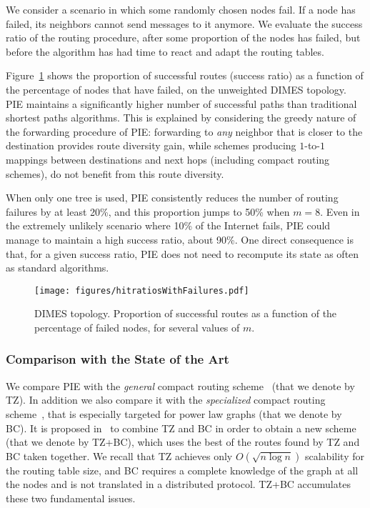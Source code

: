 \documentclass[conference]{IEEEtran}
\begin{document}
We consider a scenario in which some randomly chosen nodes fail. If a node has failed, its neighbors cannot send messages to it anymore. We evaluate the success ratio of the routing procedure, after some proportion of the nodes has failed, but before the algorithm has had time to react and adapt the routing tables.

Figure~\ref{fig:failuresDimes} shows the proportion of successful routes (success ratio) as a function of the percentage of nodes that have failed, on the unweighted DIMES topology. PIE maintains a significantly higher number of successful paths than traditional shortest paths algorithms. This is explained by considering the greedy nature of the forwarding procedure of PIE: forwarding to \emph{any} neighbor that is closer to the destination provides
route diversity gain, while schemes producing $1$-to-$1$ mappings between destinations and next hops (including compact routing schemes), do not benefit from this route diversity.

When only one tree is used, PIE consistently reduces the number of routing failures by at least 20\%, and this proportion jumps to 50\% when $m = 8$.
Even in the extremely unlikely scenario where 10\% of the Internet fails, PIE could manage to maintain a high success ratio, about 90\%.
One direct consequence is that, for a given success ratio, PIE does not need to recompute its state as often as standard algorithms.


\begin{figure}
\centering
\texttt{[image: figures/hitratiosWithFailures.pdf]}\vspace{-1em}
\caption{DIMES topology. Proportion of successful routes as a function of the percentage of failed nodes, for several values of $m$.}
\vspace{-1.3em}
\label{fig:failuresDimes}
\end{figure}

\subsubsection{Comparison with the State of the Art}
We compare PIE with the \emph{general} compact routing scheme~\cite{thorup:compact} (that we denote by TZ). In addition we also compare it with the \emph{specialized} compact routing scheme~\cite{brady}, that is especially targeted for power law graphs (that we denote by BC). It is proposed in~\cite{brady} to combine TZ and BC in order to obtain a new scheme (that we denote by TZ+BC), which uses the best of the routes found by TZ and BC taken together. We recall that TZ achieves only $O(\sqrt{n\log n})$ scalability for the routing table size, and BC requires a complete knowledge of the graph at all the nodes and is not translated in a distributed protocol. TZ+BC accumulates these two fundamental issues.
\end{document}
